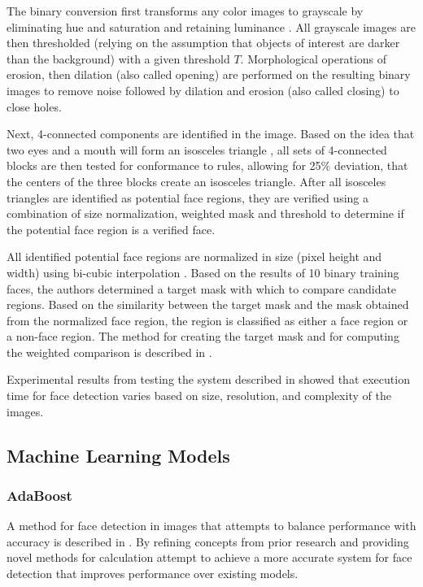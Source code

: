 The binary conversion first transforms any color images to grayscale by eliminating hue and saturation and retaining luminance \cite{lin2000human}. All grayscale images are then thresholded (relying on the assumption that objects of interest are darker than the background) with a given threshold $T$. Morphological operations of erosion, then dilation (also called opening) are performed on the resulting binary images to remove noise followed by dilation and erosion (also called closing) to close holes.

Next, 4-connected components are identified in the image. Based on the idea that two eyes and a mouth will form an isosceles triangle \cite{lin2000human}, all sets of 4-connected blocks are then tested for conformance to rules, allowing for 25\% deviation, that the centers of the three blocks create an isosceles triangle. After all isosceles triangles are identified as potential face regions, they are verified using a combination of size normalization, weighted mask and threshold to determine if the potential face region is a verified face.

All identified potential face regions are normalized in size (pixel height and width) using bi-cubic interpolation \cite{lin2000human}. Based on the results of 10 binary training faces, the authors determined a target mask with which to compare candidate regions. Based on the similarity between the target mask and the mask obtained from the normalized face region, the region is classified as either a face region or a non-face region. The method for creating the target mask and for computing the weighted comparison is described in \cite{lin2000human}. 

Experimental results from testing the system described in \cite{lin2000human} showed that execution time for face detection varies based on size, resolution, and complexity of the images.


\subsection{Machine Learning Models}
\subsubsection{AdaBoost}
A method for face detection in images that attempts to balance performance with accuracy is described in \cite{viola2004robust}. By refining concepts from prior research and providing novel methods for calculation \cite{viola2004robust} attempt to achieve a more accurate system for face detection that improves performance over existing models.

